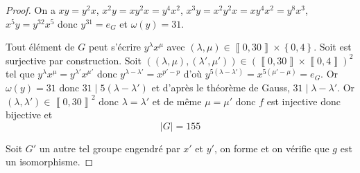 \documentclass[12pt]{article}
\begin{document}
\begin{proof}
	On a $xy=y^{2}x$, $x^{2}y=xy^{2}x=y^{4}x^{2}$, $x^{3}y=x^{2}y^{2}x=xy^{4}x^{2}=y^{8}x^{3}$, $x^{5}y=y^{32}x^{5}$ donc $y^{31}=e_{G}$ et $\omega(y)=31$. 
	
	Tout élément de $G$ peut s'écrire $y^{\lambda}x^{\mu}$ avec $\left(\lambda,\mu\right)\in\left\llbracket 0,30\right\rrbracket \times\left\{0, 4\right\}$. Soit  est surjective par construction. Soit $((\lambda,\mu),(\lambda',\mu'))\in(\left\llbracket 0,30\right\rrbracket\times\left\llbracket 0, 4\right\rrbracket)^{2}$ tel que $y^{\lambda}x^{\mu}=y^{\lambda'}x^{\mu'}$ donc $y^{\lambda-\lambda'}=x^{p'-p}$ d'où $y^{5(\lambda-\lambda')}=x^{5(\mu'-\mu)}=e_{G}$. Or $\omega(y)=31$ donc $31\mid 5(\lambda-\lambda')$ et d'après le théorème de Gauss, $31\mid \lambda-\lambda'$. Or $(\lambda,\lambda')\in\left\llbracket 0,30\right\rrbracket^{2}$ donc $\lambda=\lambda'$ et de même $\mu=\mu'$ donc $f$ est injective donc bijective et 
	\begin{equation}
		\boxed{\vert G\vert=155}
	\end{equation}
	
	Soit $G'$ un autre tel groupe engendré par $x'$ et $y'$, on forme 
	et on vérifie que $g$ est un isomorphisme.
\end{proof}
\end{document}
